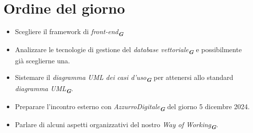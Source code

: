 

\section{Ordine del giorno}

\begin{itemize}
    \item Scegliere il framework di \emph{front-end}\textsubscript{\textit{\textbf{G}}}
    \item Analizzare le tecnologie di gestione del \emph{database vettoriale}\textsubscript{\textit{\textbf{G}}} e possibilmente già sceglierne una.
    \item Sistemare il \emph{diagramma UML dei casi d'uso}\textsubscript{\textit{\textbf{G}}} per attenersi allo standard \emph{diagramma UML}\textsubscript{\textit{\textbf{G}}}.
    \item Preparare l'incontro esterno con \emph{AzzurroDigitale}\textsubscript{\textit{\textbf{G}}} del giorno 5 dicembre 2024.
    \item Parlare di alcuni aspetti organizzativi del nostro \emph{Way of Working}\textsubscript{\textit{\textbf{G}}}.
\end{itemize}